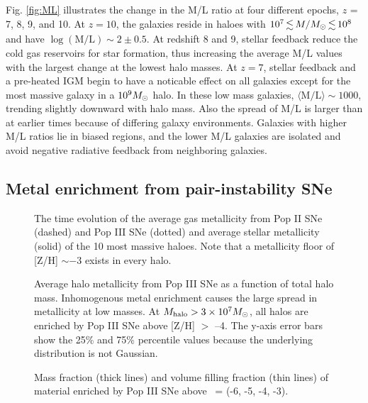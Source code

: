 \documentclass[useAMS,usenatbib]{mn2e}
\begin{document}
Fig. \ref{fig:ML} illustrates the change in the M/L ratio at four
different epochs, $z$ = 7, 8, 9, and 10.  At $z=10$, the galaxies
reside in haloes with $10^7 \la M/\Ms \la 10^8$ and have $\log
(\mathrm{M/L}) \sim 2 \pm 0.5$.  At redshift 8 and 9, stellar feedback
reduce the cold gas reservoirs for star formation, thus increasing the
average M/L values with the largest change at the lowest halo masses.
At $z=7$, stellar feedback and a pre-heated IGM begin to have a
noticable effect on all galaxies except for the most massive galaxy in
a $10^9 \Ms$ halo.  In these low mass galaxies,
$\langle\mathrm{M/L}\rangle \sim 1000$, trending slightly downward
with halo mass.  Also the spread of M/L is larger than at earlier
times because of differing galaxy environments.  Galaxies with higher
M/L ratios lie in biased regions, and the lower M/L galaxies are
isolated and avoid negative radiative feedback from neighboring
galaxies.

\subsection{Metal enrichment from pair-instability SNe}

\begin{figure}
  \caption{\label{fig:Zevo} The time evolution of the average gas
    metallicity from Pop II SNe (dashed) and Pop III SNe (dotted) and
    average stellar metallicity (solid) of the 10 most massive haloes.
    Note that a metallicity floor of [Z/H] $\sim -3$ exists in every
    halo.}
\end{figure}

\begin{figure}
  \caption{\label{fig:zhalo3} Average halo metallicity from Pop III
    SNe as a function of total halo mass.  Inhomogenous metal
    enrichment causes the large spread in metallicity at low masses.
    At $M_{\rm halo} > 3 \times 10^7 \Ms$, all halos are enriched by
    Pop III SNe above [Z/H] $>$ --4.  The y-axis error bars show the
    25\% and 75\% percentile values because the underlying
    distribution is not Gaussian.}
\end{figure}

\begin{figure}
  \caption{\label{fig:z3fill} Mass fraction (thick lines) and volume
    filling fraction (thin lines) of material enriched by Pop III SNe
    above \zthree~= (-6, -5, -4, -3).}
\end{figure}
\end{document}
